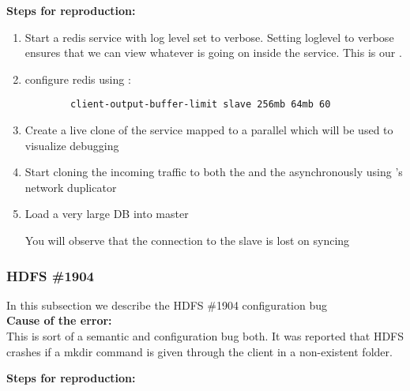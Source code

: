 \noindent \textbf{Steps for reproduction:} \\

\begin{adjustwidth}{0.5cm}{}
	\begin{enumerate}
		\item Start a redis service with log level set to verbose. Setting loglevel to verbose ensures that we can view whatever is going on inside the service. This is our \productioncontainer.
		\item configure redis using :
		
		\begin{lstlisting}
		client-output-buffer-limit slave 256mb 64mb 60
		\end{lstlisting}
		
		\item Create a live clone of the service mapped to a parallel \debugcontainer which will be used to visualize debugging
		\item Start cloning the incoming traffic to both the \productioncontainer and the \debugcontainer asynchronously using \parikshan's network duplicator
		
		\item Load a very large DB into master
		
		You will observe that the connection to the slave is lost on syncing
		
	\end{enumerate}
\end{adjustwidth}


\subsubsection{HDFS \#1904}

In this subsection we describe the HDFS \#1904 configuration bug \\

\noindent \textbf{Cause of the error:} \\

This is sort of a semantic and configuration bug both. It was reported that HDFS crashes if a mkdir command is given through the client in a non-existent folder.

\noindent \textbf{Steps for reproduction:} \\

